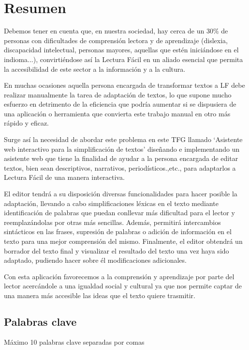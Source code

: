 \chapter*{Resumen}

Debemos tener en cuenta que, en nuestra sociedad, hay cerca de un 30\% de personas con dificultades de comprensión lectora y de aprendizaje (dislexia, discapacidad intelectual, personas mayores, aquellas que estén iniciándose en el indioma...), convirtiéndose así la Lectura Fácil en un aliado esencial que permita la accesibilidad de este sector a la información y a la cultura. 

 \setlength{\parskip}{10pt}

En muchas ocasiones aquella persona encargada de transformar textos a LF debe realizar manualmente la tarea de adaptación de textos, lo que supone mucho esfuerzo en detrimento de la eficiencia que podría aumentar si se dispusiera de una aplicación o herramienta que convierta este trabajo manual en otro más rápido y eficaz.

 \setlength{\parskip}{10pt}

Surge así la necesidad de abordar este problema en este TFG llamado ‘Asistente web interactivo para la simplificación de textos’ diseñando e implementando un asistente web que tiene la finalidad de ayudar a la persona encargada de editar textos, bien sean descriptivos, narrativos, periodísticos.,etc., para adaptarlos a Lectura Fácil de una manera interactiva. 

 \setlength{\parskip}{10pt}

El editor tendrá a su disposición diversas funcionalidades para hacer posible la adaptación, llevando a cabo simplificaciones léxicas en el texto mediante identificación de palabras que puedan conllevar más dificultad para el lector y reemplazándolas por otras más sencillas. Además, permitirá intercambios sintácticos en las frases, supresión de palabras o adición de información en el texto para una mejor comprensión del mismo. Finalmente, el editor obtendrá un borrador del texto final y visualizar el resultado del texto una vez haya sido adaptado, pudiendo hacer sobre él modificaciones adicionales.

 \setlength{\parskip}{10pt}

Con esta aplicación favorecemos a la comprensión y aprendizaje por parte del lector acercándole a una igualdad social y cultural ya que nos permite captar de una manera más accesible las ideas que el texto quiere trasmitir.



\section*{Palabras clave}
   
\noindent Máximo 10 palabras clave separadas por comas

   


